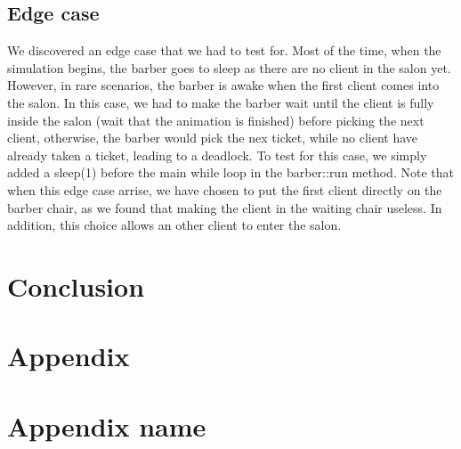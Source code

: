 \documentclass{article}
\begin{document}
    \subsection{Edge case}
    We discovered an edge case that we had to test for. Most of the time, when the simulation begins, the barber goes to sleep as there are no client in the salon yet. However, in rare scenarios, the barber is awake when the first client comes into the salon. In this case, we had to make the barber wait until the client is fully inside the salon (wait that the animation is finished) before picking the next client, otherwise, the barber would pick the nex ticket, while no client have already taken a ticket, leading to a deadlock. To test for this case, we simply added a sleep(1) before the main while loop in the barber::run method.
    Note that when this edge case arrise, we have chosen to put the first client directly on the barber chair, as we found that making the client in the waiting chair useless. In addition, this choice allows an other client to enter the salon.

    \section{Conclusion}

    \section*{Appendix}

    \section{Appendix name}
\end{document}
